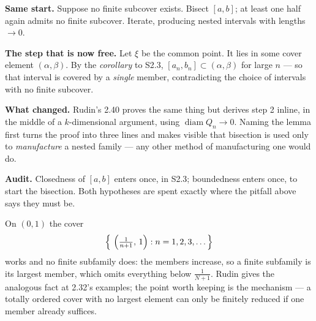 \begin{proofwalk}
  \item \textbf{Same start.} Suppose no finite subcover exists. Bisect
        $[a,b]$; at least one half again admits no finite subcover. Iterate,
        producing nested intervals with lengths $\to 0$.
  \item \textbf{The step that is now free.} Let $\xi$ be the common point.
        It lies in some cover element $(\alpha,\beta)$. By the
        \emph{corollary} to S2.3, $[a_n,b_n] \subset (\alpha,\beta)$ for
        large $n$ --- so that interval is covered by a \emph{single} member,
        contradicting the choice of intervals with no finite subcover.
  \item \textbf{What changed.} Rudin's 2.40 proves the same thing but derives
        step 2 inline, in the middle of a $k$-dimensional argument, using
        $\operatorname{diam} Q_n \to 0$. Naming the lemma first turns the
        proof into three lines and makes visible that bisection is used only
        to \emph{manufacture} a nested family --- any other method of
        manufacturing one would do.
  \item \textbf{Audit.} Closedness of $[a,b]$ enters once, in S2.3;
        boundedness enters once, to start the bisection. Both hypotheses are
        spent exactly where the pitfall above says they must be.
\end{proofwalk}

\begin{pitfall}
On $(0,1)$ the cover
\[ \Bigl\{\ \Bigl(\tfrac{1}{n+1},\,1\Bigr) : n = 1,2,3,\dots \Bigr\} \]
works and no finite subfamily does: the members increase, so a finite
subfamily is its largest member, which omits everything below
$\tfrac1{N+1}$. Rudin gives the analogous fact at 2.32's examples; the point
worth keeping is the mechanism --- a totally ordered cover with no largest
element can only be finitely reduced if one member already suffices.
\end{pitfall}

\begin{center}
\end{center}


